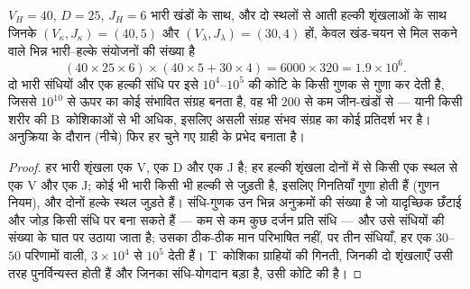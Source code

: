 \begin{theorem}[संग्रह का आकार]\label{thm:b3:adaptive-immunity:repertoire}
$V_{H} = 40$, $D = 25$, $J_{H} = 6$ भारी खंडों के साथ, और दो स्थलों से
आती हल्की शृंखलाओं के साथ जिनके $(V_{\kappa}, J_{\kappa}) = (40, 5)$
और $(V_{\lambda}, J_{\lambda}) = (30, 4)$ हों, केवल खंड-चयन से मिल
सकने वाले भिन्न भारी--हल्के संयोजनों की संख्या है
\[
(40\times 25\times 6)\times(40\times 5 + 30\times 4) = 6000\times 320
= 1.9\times 10^{6}.
\]
दो भारी संधियों और एक हल्की संधि पर  इसे $10^{4}$--$10^{5}$
की कोटि के किसी गुणक से गुणा कर देती है, जिससे $10^{10}$ से ऊपर का कोई
संभावित संग्रह बनता है, वह भी $200$ से कम जीन-खंडों से --- यानी किसी
शरीर की B~कोशिकाओं से भी अधिक, इसलिए असली संग्रह संभव संग्रह का कोई
प्रतिदर्श भर है। अनुक्रिया के दौरान  (नीचे) फिर हर
चुने गए ग्राही के प्रभेद बनाता है।
\end{theorem}
\begin{proof}
हर भारी शृंखला एक V, एक D और एक J है; हर हल्की शृंखला दोनों में से
किसी एक स्थल से एक V और एक J; कोई भी भारी किसी भी हल्की से जुड़ती है,
इसलिए गिनतियाँ गुणा होती हैं (गुणन नियम), और दोनों हल्के स्थल जुड़ते
हैं। संधि-गुणक उन भिन्न अनुक्रमों की संख्या है जो यादृच्छिक छँटाई और
जोड़ किसी संधि पर बना सकते हैं --- कम से कम कुछ दर्जन प्रति संधि ---
और उसे संधियों की संख्या के घात पर उठाया जाता है; उसका ठीक-ठीक मान
परिभाषित नहीं, पर तीन संधियाँ, हर एक $30$--$50$ परिणामों वाली,
$3\times 10^{4}$ से $10^{5}$ देती हैं। T~कोशिका ग्राहियों की गिनती,
जिनकी दो शृंखलाएँ उसी तरह पुनर्विन्यस्त होती हैं और जिनका संधि-योगदान
बड़ा है, उसी कोटि की है।
\end{proof}

